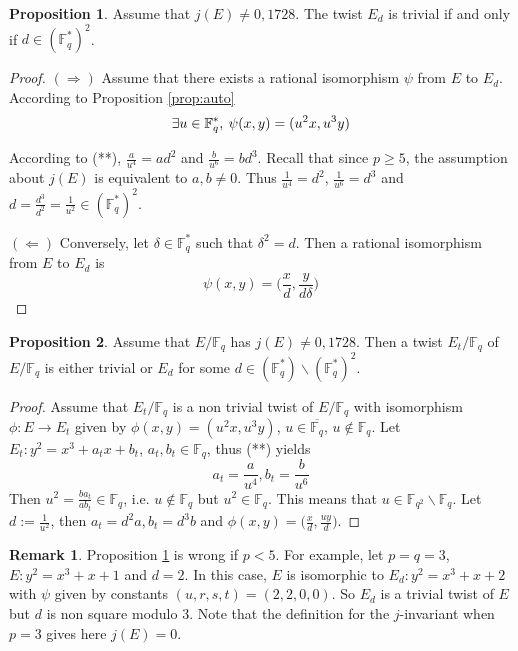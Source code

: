 \documentclass[10pt]{article}
\theoremstyle{definition}
\newtheorem{proposition}{Proposition}
\newtheorem{remark}{Remark}
\newcommand{\F}{\mathbb{F}}
\begin{document}
\begin{proposition}\label{prop:trivialtwist}
Assume that $j(E) \neq 0,1728$.
The twist $E_d$ is trivial if and only if $d \in (\F_q^*)^2$.
\end{proposition}

\begin{proof}
$(\Rightarrow)$ Assume that there exists a rational isomorphism $\psi$ from $E$ to $E_d$.
According to Proposition \ref{prop:auto}
\[ \exists u \in \F_q^*, \mkern4mu \psi(x,y) = (u^2x,u^3y) \]

According to (**), $\frac{a}{u^4} = ad^2$ and $\frac{b}{u^6} = bd^3$.
Recall that since $ p \geq 5$, the assumption about $j(E)$ is equivalent to $a,b \neq 0$.
Thus $\frac{1}{u^4} = d^2$, $\frac{1}{u^6} = d^3$ and $d = \frac{d^3}{d^2} = \frac{1}{u^2} \in (\F_q^*)^2$.

$(\Leftarrow)$ Conversely, let $\delta \in \F_q^*$ such that $\delta^2 = d$.
Then  a rational isomorphism from $E$ to $E_d$ is
\[ \psi(x,y) = \big(\frac{x}{d},\frac{y}{d\delta}\big) \]
\end{proof}


\begin{proposition}
Assume that $E/\F_q$ has $j(E) \neq 0, 1728$. 
Then a twist $E_t/\F_q$ of $E/\F_q$ is either trivial or $E_d$ for some $d \in (\F_q^*) \backslash (\F_q^*)^2$.
\end{proposition}
\begin{proof}
Assume that $E_t/\F_q$ is a non trivial twist of $E/\F_q$ with isomorphism $\phi : E \to E_t$ given by $\phi(x,y) = (u^2x,u^3y)$, $u \in \overline{\F_q}$, $u \notin \F_q$.
Let $E_t : y^2 = x^3 +a_tx+b_t$, $a_t,b_t \in \F_q$, thus (**) yields
\[ a_t = \frac{a}{u^4}, b_t = \frac{b}{u^6} \]
Then $u^2 = \frac{ba_t}{ab_t} \in \F_q$, i.e. $u \notin \F_q$ but $u^2 \in \F_q$.
This means that $u \in \F_{q^2} \backslash \F_q$.
Let $d := \frac{1}{u^2}$, then $a_t = d^2a, b_t = d^3b$ and $\phi(x,y) = \big(\frac{x}{d},\frac{uy}{d} \big)$.
\end{proof}


\noindent \begin{remark}
Proposition \ref{prop:trivialtwist} is wrong if $p < 5$.
For example, let $p=q=3$, $E : y^2 = x^3 + x + 1$ and $d = 2$.
In this case, $E$ is isomorphic to $E_d : y^2 = x^3+x+2$  with $\psi$ given by constants $(u,r,s,t) = (2,2,0,0)$.
So $E_d$ is a trivial twist of $E$ but $d$ is non square modulo $3$.
Note that the definition for the $j$-invariant when $p=3$ gives here $j(E) = 0$.
\end{remark}
\end{document}
